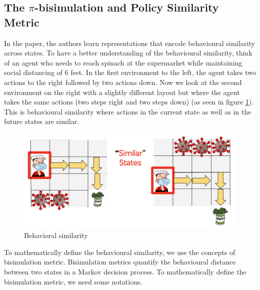 \documentclass{usiinftr}
\begin{document}
\subsection{The $\pi$-bisimulation and Policy Similarity Metric} \label{sec: PSM}
In the paper, the authors learn representations that encode behavioural similarity across states. To have a better understanding of the behavioural similarity, think of an agent who needs to reach spinach at the supermarket while maintaining social distancing of 6 feet. In the first environment to the left, the agent takes two actions to the right followed by two actions down. Now we look at the second environment on the right with a slightly different layout but where the agent takes the same actions (two steps right and two steps down) (as seen in figure \ref{fig:BehavioralSimilarity}). This is behavioural similarity where actions in the current state as well as in the future states are similar.

\begin{figure}[h]
    \centering
    \includegraphics[width = \linewidth]{figures/image3.png}
    \caption{Behavioral similarity \cite{github_contrastive_similarity} }
    \label{fig:BehavioralSimilarity}
\end{figure}

To mathematically define the behavioural similarity, we use the concepts of bisimulation metric. Bisimulation metrics quantify the behavioural distance between two states in a Markov decision process. To mathematically define the bisimulation metric, we need some notations.
\end{document}
